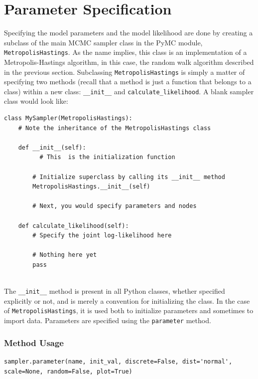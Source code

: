 \documentclass[]{book}
\begin{document}
\section{Parameter Specification}\label{sec:parameter_specification}

Specifying the model parameters and the model likelihood are done by creating a subclass of the main MCMC sampler class in the PyMC module, \verb=MetropolisHastings=. As the name implies, this class is an implementation of a Metropolis-Hastings algorithm, in this case, the random walk algorithm described in the previous section. Subclassing \verb=MetropolisHastings= is simply a matter of specifying two methods (recall that a method is just a function that belongs to a class) within a new class: \verb=__init__= and \verb=calculate_likelihood=. A blank sampler class would look like:

\begin{verbatim}
class MySampler(MetropolisHastings):
    # Note the inheritance of the MetropolisHastings class

    def __init__(self):
		  # This  is the initialization function
   
        # Initialize superclass by calling its __init__ method
        MetropolisHastings.__init__(self)
        
        # Next, you would specify parameters and nodes
        
    def calculate_likelihood(self):
        # Specify the joint log-likelihood here

        # Nothing here yet
        pass
		  
\end{verbatim}

The \verb=__init__= method is present in all Python classes, whether specified explicitly or not, and is merely a convention for initializing the class. In the case of \verb=MetropolisHastings=, it is used both to initialize parameters and sometimes to import data. Parameters are specified using the \verb=parameter= method.

\subsubsection*{Method Usage}
\begin{verbatim}
sampler.parameter(name, init_val, discrete=False, dist='normal', 
scale=None, random=False, plot=True)
\end{verbatim}
\end{document}
